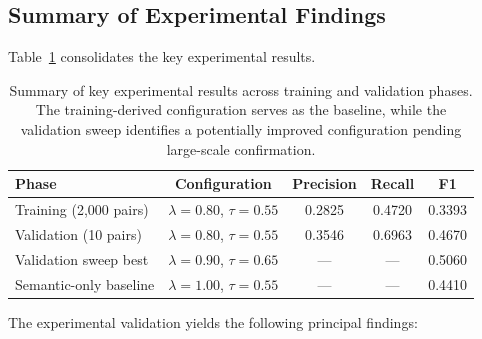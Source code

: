 \documentclass[12pt, a4paper]{article}
\begin{document}
\subsection{Summary of Experimental Findings}

Table~\ref{tab:summary} consolidates the key experimental results.

\begin{table}[htbp]
	\centering
	\caption{Summary of key experimental results across training and validation phases. The training-derived configuration serves as the baseline, while the validation sweep identifies a potentially improved configuration pending large-scale confirmation.}
	\label{tab:summary}
	\begin{tabular}{lcccc}
		\toprule
		\textbf{Phase} & \textbf{Configuration} & \textbf{Precision} & \textbf{Recall} & \textbf{F1} \\
		\midrule
		Training (2{,}000 pairs) & $\lambda{=}0.80$, $\tau{=}0.55$ & 0.2825 & 0.4720 & 0.3393 \\
		Validation (10 pairs) & $\lambda{=}0.80$, $\tau{=}0.55$ & 0.3546 & 0.6963 & 0.4670 \\
		Validation sweep best & $\lambda{=}0.90$, $\tau{=}0.65$ & --- & --- & 0.5060 \\
		Semantic-only baseline & $\lambda{=}1.00$, $\tau{=}0.55$ & --- & --- & 0.4410 \\
		\bottomrule
	\end{tabular}
\end{table}

The experimental validation yields the following principal findings:
\end{document}
